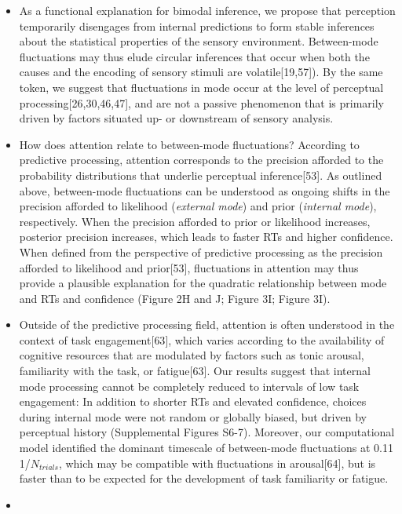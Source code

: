 \documentclass[
]{article}
\begin{document}
\begin{itemize}
\item
  As a functional explanation for bimodal inference, we propose that
  perception temporarily disengages from internal predictions to form
  stable inferences about the statistical properties of the sensory
  environment. Between-mode fluctuations may thus elude circular
  inferences that occur when both the causes and the encoding of sensory
  stimuli are volatile{[}19,57{]}). By the same token, we suggest that
  fluctuations in mode occur at the level of perceptual
  processing{[}26,30,46,47{]}, and are not a passive phenomenon that is
  primarily driven by factors situated up- or downstream of sensory
  analysis.
\item
  How does attention relate to between-mode fluctuations? According to
  predictive processing, attention corresponds to the precision afforded
  to the probability distributions that underlie perceptual
  inference{[}53{]}. As outlined above, between-mode fluctuations can be
  understood as ongoing shifts in the precision afforded to likelihood
  (\emph{external mode}) and prior (\emph{internal mode}), respectively.
  When the precision afforded to prior or likelihood increases,
  posterior precision increases, which leads to faster RTs and higher
  confidence. When defined from the perspective of predictive processing
  as the precision afforded to likelihood and prior{[}53{]},
  fluctuations in attention may thus provide a plausible explanation for
  the quadratic relationship between mode and RTs and confidence (Figure
  2H and J; Figure 3I; Figure 3I).
\item
  Outside of the predictive processing field, attention is often
  understood in the context of task engagement{[}63{]}, which varies
  according to the availability of cognitive resources that are
  modulated by factors such as tonic arousal, familiarity with the task,
  or fatigue{[}63{]}. Our results suggest that internal mode processing
  cannot be completely reduced to intervals of low task engagement: In
  addition to shorter RTs and elevated confidence, choices during
  internal mode were not random or globally biased, but driven by
  perceptual history (Supplemental Figures S6-7). Moreover, our
  computational model identified the dominant timescale of between-mode
  fluctuations at 0.11 1/\(N_{trials}\), which may be compatible with
  fluctuations in arousal{[}64{]}, but is faster than to be expected for
  the development of task familiarity or fatigue.
\item

\end{itemize}
\end{document}

